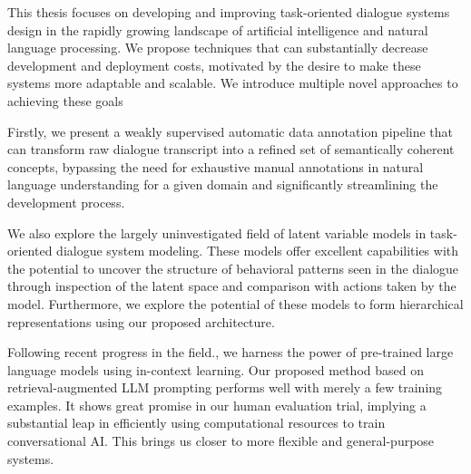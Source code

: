 This thesis focuses on developing and improving task-oriented dialogue systems design in the rapidly growing landscape of artificial intelligence and natural language processing.
We propose techniques that can substantially decrease development and deployment costs, motivated by the desire to make these systems more adaptable and scalable.
We introduce multiple novel approaches to achieving these goals

Firstly, we present a weakly supervised automatic data annotation pipeline that can transform raw dialogue transcript into a refined set of semantically coherent concepts, bypassing the need for exhaustive manual annotations in natural language understanding for a given domain and significantly streamlining the development process.

We also explore the largely uninvestigated field of latent variable models in task-oriented dialogue system modeling.
These models offer excellent capabilities with the potential to uncover the structure of behavioral patterns seen in the dialogue through inspection of the latent space and comparison with actions taken by the model.
Furthermore, we explore the potential of these models to form hierarchical representations using our proposed architecture.

Following recent progress in the field., we harness the power of pre-trained large language models using in-context learning.
Our proposed method based on retrieval-augmented LLM prompting performs well with merely a few training examples.
It shows great promise in our human evaluation trial, implying a substantial leap in efficiently using computational resources to train conversational AI.
This brings us closer to more flexible and general-purpose systems.

